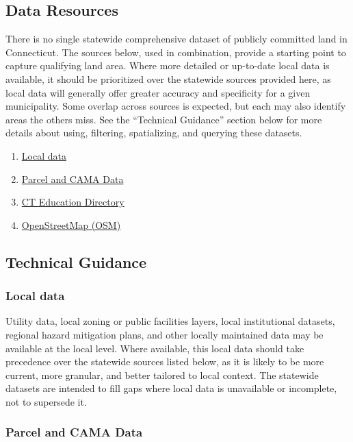 \documentclass[
  letterpaper,
  DIV=11,
  numbers=noendperiod]{scrreprt}
\providecommand{\tightlist}{%
  \setlength{\itemsep}{0pt}\setlength{\parskip}{0pt}}
\begin{document}
\subsection{Data Resources}\label{data-resources}

There is no single statewide comprehensive dataset of publicly committed
land in Connecticut. The sources below, used in combination, provide a
starting point to capture qualifying land area. Where more detailed or
up-to-date local data is available, it should be prioritized over the
statewide sources provided here, as local data will generally offer
greater accuracy and specificity for a given municipality. Some overlap
across sources is expected, but each may also identify areas the others
miss. See the ``Technical Guidance'' section below for more details
about using, filtering, spatializing, and querying these datasets.

\begin{enumerate}
\def\labelenumi{\arabic{enumi}.}
\tightlist
\item
  \hyperref[sec-local-data]{Local data}
\item
  \hyperref[sec-parcel-and-cama-data]{Parcel and CAMA Data}
\item
  \hyperref[sec-ct-education-directory]{CT Education Directory}
\item
  \hyperref[sec-openstreetmap]{OpenStreetMap (OSM)}
\end{enumerate}

\subsection{Technical Guidance}\label{technical-guidance}

\subsubsection{Local data}\label{sec-local-data}

Utility data, local zoning or public facilities layers, local
institutional datasets, regional hazard mitigation plans, and other
locally maintained data may be available at the local level. Where
available, this local data should take precedence over the statewide
sources listed below, as it is likely to be more current, more granular,
and better tailored to local context. The statewide datasets are
intended to fill gaps where local data is unavailable or incomplete, not
to supersede it.

\subsubsection{Parcel and CAMA Data}\label{sec-parcel-and-cama-data}
\end{document}
